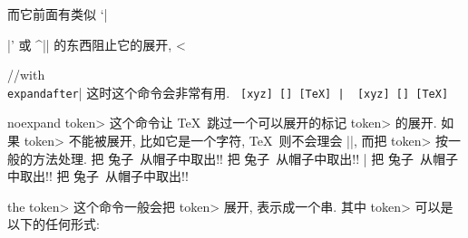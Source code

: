 而它前面有类似 `|{|' 或 ^|\string| 的东西阻止它的展开,
^^|{//with {\tt\\expandafter}|
这时这个命令会非常有用.
\example
\def\aa{xyz}
\tt %
[\string\aa]  [\expandafter\string\aa]
[\expandafter\string\csname TeX\endcsname]
|
\produces
\def\aa{xyz}
\tt
[\string\aa]  [\expandafter\string\aa]
[\expandafter\string\csname TeX\endcsname]
\endexample
\enddesc

\begindesc
\cts noexpand {\<token>}
\explain
这个命令让 \TeX\ 跳过一个可以展开的标记 \<token> 的展开.
如果 \<token> 不能被展开, 比如它是一个字符,
\TeX\ 则不会理会 |\noexpand|, 而把 \<token> 按一般的方法处理.
\example
\def\bunny{兔子}
\edef\magic{把 \noexpand\bunny\ 从帽子中取出!! }
\let\oldbunny=\bunny \def\bunny{兔} \magic
\let\bunny=\oldbunny \magic
|
\produces
\def\bunny{兔子}
\edef\magic{把 \noexpand\bunny\ 从帽子中取出!! }
\let\oldbunny=\bunny \def\bunny{兔} \magic
\let\bunny=\oldbunny \magic
\endexample
\enddesc

\begindesc
\cts the {\<token>}
\explain
这个命令一般会把 \<token> 展开, 表示成一个串.
其中 \<token>  可以是以下的任何形式:

}}

